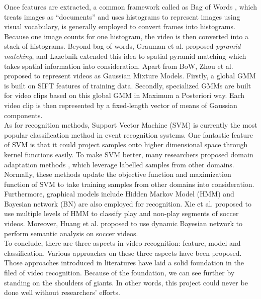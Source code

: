 \noindent Once features are extracted, a common framework called as Bag of Words \cite{sivic2003video}, which treats images as ``documents'' and uses histograms to represent images using visual vocabulary, is generally employed to convert frames into histograms. Because one image counts for one histogram, the video is then converted into a stack of histograms. Beyond bag of words, Grauman et al. \cite{grauman2005pyramid} proposed {\em pyramid matching}, and Lazebnik extended this idea to spatial pyramid matching \cite{lazebnik2006beyond} which takes spatial information into consideration. Apart from BoW, Zhou et al. \cite{zhou2008sift} proposed to represent videos as Gaussian Mixture Models. Firstly, a global GMM is built on SIFT features of training data. Secondly, specialized GMMs are built for video clips based on this global GMM in Maximum a Posteriori way. Each video clip is then represented by a fixed-length vector of means of Gaussian components. \\

\noindent As for recognition methods, Support Vector Machine (SVM) \cite{boser1992training} is currently the most popular classification method in event recognition systems. One fantastic feature of SVM is that it could project samples onto higher dimensional space through kernel functions easily. To make SVM better, many researchers proposed domain adaptation methods \cite{daume2007frustratingly, yang2007cross, duan2009domain, duan2012visual}, which leverage labelled samples from other domains. Normally, these methods update the objective function and maximization function of SVM to take training samples from other domains into consideration. Furthermore, graphical models include Hidden Markov Model (HMM) and Bayesian network (BN) are also employed for recognition.  Xie et al. \cite{xie2002structure} proposed to use multiple levels of HMM to classify play and non-play segments of soccer videos. Moreover, Huang et al. \cite{huang2006semantic} proposed to use dynamic Bayesian network to perform semantic analysis on soccer videos. \\

\noindent To conclude, there are three aspects in video recognition: feature, model and classification. Various approaches on these three aspects have been proposed. Those approaches introduced in literatures have laid a solid foundation in the filed of video recognition. Because of the foundation, we can see further by standing on the shoulders of giants. In other words, this project could never be done well without researchers' efforts. 